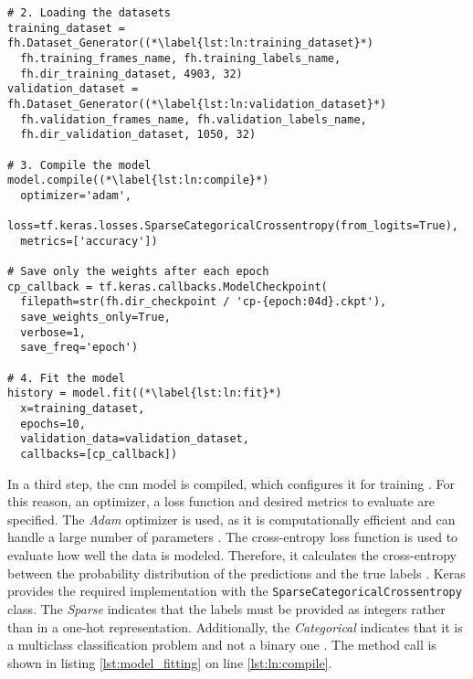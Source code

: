 \begin{lstlisting}[style=python, caption={Training of the model}, label=lst:model_fitting]
# 2. Loading the datasets
training_dataset = fh.Dataset_Generator((*\label{lst:ln:training_dataset}*)
  fh.training_frames_name, fh.training_labels_name,
  fh.dir_training_dataset, 4903, 32)
validation_dataset = fh.Dataset_Generator((*\label{lst:ln:validation_dataset}*)
  fh.validation_frames_name, fh.validation_labels_name,
  fh.dir_validation_dataset, 1050, 32)

# 3. Compile the model
model.compile((*\label{lst:ln:compile}*)
  optimizer='adam',
  loss=tf.keras.losses.SparseCategoricalCrossentropy(from_logits=True),
  metrics=['accuracy'])

# Save only the weights after each epoch
cp_callback = tf.keras.callbacks.ModelCheckpoint(
  filepath=str(fh.dir_checkpoint / 'cp-{epoch:04d}.ckpt'),
  save_weights_only=True,
  verbose=1,
  save_freq='epoch')

# 4. Fit the model
history = model.fit((*\label{lst:ln:fit}*)
  x=training_dataset,
  epochs=10,
  validation_data=validation_dataset,
  callbacks=[cp_callback])
\end{lstlisting}

In a third step, the \acrshort{cnn} model is compiled, which configures it for training \cite{training_arch_tf_keras_sequential}.
For this reason, an optimizer, a loss function and desired metrics to evaluate are specified.
The \textit{Adam} optimizer is used, as it is computationally efficient and can handle a large number of parameters \cite{training_arch_adam}.
The cross-entropy loss function is used to evaluate how well the data is modeled.
Therefore, it calculates the cross-entropy between the probability distribution of the predictions and the true labels \cite{training_train_entropy}. 
Keras provides the required implementation with the \texttt{SparseCategoricalCrossentropy} class.
The \textit{Sparse} indicates that the labels must be provided as integers rather than in a one-hot representation.
Additionally, the \textit{Categorical} indicates that it is a multiclass classification problem and not a binary one \cite{training_train_tf_keras_crossentropy}.
The method call is shown in listing \ref{lst:model_fitting} on line \ref{lst:ln:compile}.

